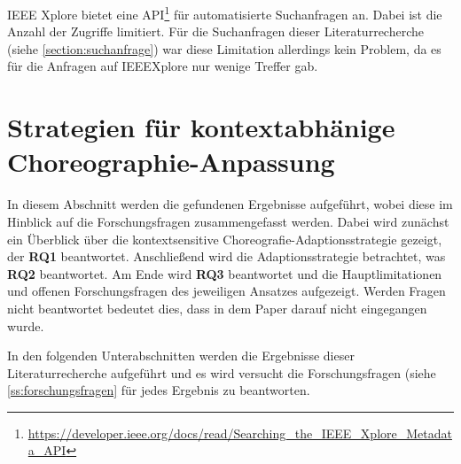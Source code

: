\documentclass[conference,compsoc,ngerman]{IEEEtran}
\begin{document}
IEEE Xplore bietet eine API\footnote{\url{https://developer.ieee.org/docs/read/Searching_the_IEEE_Xplore_Metadata_API}} für automatisierte Suchanfragen an. Dabei ist die Anzahl der Zugriffe limitiert. Für die Suchanfragen dieser Literaturrecherche (siehe \cref{section:suchanfrage}) war diese Limitation allerdings kein Problem, da es für die Anfragen auf IEEEXplore nur wenige Treffer gab.

%
%
%
%

\section{Strategien für kontextabhänige Choreographie-Anpassung}\label{s:contextAwareResults}
In diesem Abschnitt werden die gefundenen Ergebnisse aufgeführt, wobei diese im Hinblick auf die Forschungsfragen zusammengefasst werden. Dabei wird zunächst  ein Überblick über die kontextsensitive Choreografie-Adaptionsstrategie gezeigt, der \textbf{RQ1} beantwortet. Anschließend wird die Adaptionsstrategie betrachtet, was \textbf{RQ2} beantwortet. Am Ende wird \textbf{RQ3} beantwortet und die Hauptlimitationen und offenen Forschungsfragen des jeweiligen Ansatzes aufgezeigt.
Werden Fragen nicht beantwortet bedeutet dies, dass in dem Paper darauf nicht eingegangen wurde.

In den folgenden Unterabschnitten werden die Ergebnisse dieser Literaturrecherche aufgeführt und es wird versucht die Forschungsfragen (siehe \cref{ss:forschungsfragen} für jedes Ergebnis zu beantworten.
\end{document}
